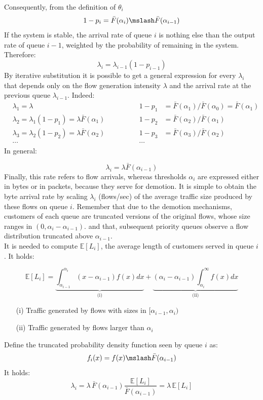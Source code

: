 Consequently, from the definition of $\theta_i$
\[ 	
1-p_i = \bar{F}(\alpha_{i}) \mslash \bar{F}(\alpha_{i-1}) 
\]
If the system is stable, the arrival rate of queue $i$ is nothing else than the output rate
of queue $i-1$, weighted by the probability of remaining in the system. 
Therefore:
\[
\lambda_i = \lambda_{i-1} (1-p_{i-1})
\]
By iterative substitution it is possible to get a general expression for every $\lambda_i$ that depends only on the flow generation intensity $\lambda$ and the arrival rate at the previous queue $\lambda_{i-1}$. Indeed:
\begin{align*}
&\lambda_1 = \lambda \qquad \qquad & 1-p_1 &= \bar{F}(\alpha_1) / \bar{F}(\alpha_0) = \bar{F}(\alpha_1) \\
&\lambda_2 =  \lambda_1 (1-p_1) = \lambda \bar{F}(\alpha_1)  \qquad \qquad & 1-p_2 &= \bar{F}(\alpha_2) / \bar{F}(\alpha_1) \\
&\lambda_3 =  \lambda_2 (1-p_2) = \lambda \bar{F}(\alpha_2)  \qquad \qquad & 1-p_3 &= \bar{F}(\alpha_3) / \bar{F}(\alpha_2) \\
& \cdots \qquad \qquad & \cdots &
\end{align*}
In general:

\[
	\lambda_{i} = \lambda \bar{F}(\alpha_{i-1})
\]
Finally, this rate refers to flow arrivals, whereas thresholds $\alpha_i$ are expressed either in bytes or in packets, because they serve for demotion. It is simple to obtain the byte arrival rate by scaling $\lambda_i$ (flows/sec) of the average traffic size produced by these flows on queue $i$. Remember that due to the demotion mechanisms, customers of each queue are truncated versions of the original flows, whose size ranges in $(0, \alpha_{i}-\alpha_{i-1})$. and that, subsequent priority queues observe a flow distribution truncated above $\alpha_{i-1}$. \\
It is needed to compute $\mathbb{E}[L_i]$, the average length of customers served in queue $i$. It holds:

\begin{equation}
\label{load-on-pqi}
\mathbb{E}[L_i]=
\underbrace{\int_{\alpha_{i-1}}^{\alpha_i}(x-\alpha_{i-1})f(x)dx}_{\text{(i)}} +
\underbrace{(\alpha_{i}-\alpha_{i-1})\int_{\alpha_i}^{\infty}f(x)dx}_{\text{(ii)}}
\end{equation}

\begin{itemize}
	\item[(i)]Traffic generated by flows with sizes in $[\alpha_{i-1},\alpha_{i})$
	\item[(ii)] Traffic generated by flows larger than $\alpha_{i}$
\end{itemize}
Define the truncated probability density function seen by queue $i$ as:
\[
f_i(x) = f(x) \mslash \bar{F}(\alpha_{i-1})
\]
It holds:
\begin{equation}
\lambda_i =   \lambda \, \bar{F}(\alpha_{i-1}) \frac{\mathbb{E}[L_i]}{\bar{F}(\alpha_{i-1})} = \lambda \, \mathbb{E}[L_i]
\end{equation}

